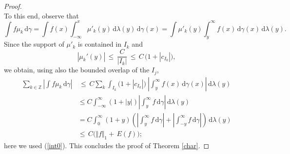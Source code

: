 \documentclass{amsart}                 %
\numberwithin{equation}{section}
\renewcommand\mod[1]{\left\vert{#1}\right\vert}
\newcommand\norm[2]{{\Vert{#1}\Vert_{#2}}}
\newcommand\wrt{\,\mathrm{d}}
\newcommand\1{{\bf 1}}
\newcommand\BZ{\mathbb{Z}}
\newcommand\ga{\gamma}    \newcommand\Ga{\Gamma}
\begin{document}
\begin{proof}
\begin{equation}
\end{equation}
To this end, observe that
$$
 \int f \mu_k \wrt \ga =\int f(x)\int_{-\infty}^x\mu'_k(y)\wrt\lambda(y)\wrt\gamma(x)=\int 
\mu'_k(y)\int_y^\infty f(x)\wrt\gamma(x)\wrt\lambda(y).
$$
Since the support of $\mu'_k$ is contained in $I_k$ and
$$
\mod{\mu_k'(y)}\,\le\, \frac{C}{\mod{I_k}}\,\le\, C \,\big(1+\mod{c_{I_k}}
\big),
$$
we obtain, using also the bounded overlap of the $I_j$,
\begin{align*}
  \sum_{k\in \BZ}\left| \int f \mu_k \wrt \ga \right| &\,\le\,C \sum_k\int_{I_k}\big(1+\mod{c_{I_k}}\big)\ 
\mod{\int_y^\infty f(x)\wrt\gamma(x)}\wrt\lambda(y) \\
&\le C\int_{-\infty}^\infty (1+\mod{y}) \mod{\int_y^\infty f\wrt \ga}\wrt
\lambda(y) \\
&= C\int_{0}^\infty (1+y) \left(\mod{\int_y^\infty f\wrt \ga}+\mod{\int_{-y}
^\infty f\wrt \ga}\right)\wrt\lambda(y) \\ 
&\le\, C\big(\norm{f}{1}+ \,E(f)\big);
\end{align*}
here we used  (\ref{int0}). 
This concludes the proof of Theorem \ref{char}. 
\end{proof}
\end{document}
